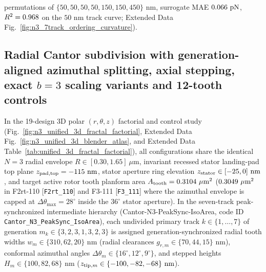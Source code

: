 \documentclass[pdflatex,sn-nature]{sn-jnl}
\DeclareRobustCommand{\roundthree}[1]{\fpeval{round(#1,3)}}
\DeclareRobustCommand{\roundfour}[1]{\fpeval{round(#1,4)}}
\begin{document}
permutations of $\{50, 50, 50, 50, 150, 150, 450\}\text{ nm}$, surrogate MAE $\roundthree{\NthreeCurvRadialModelMaePn}\text{ pN}$, $R^2 = \roundthree{\NthreeCurvTrackFivezeronmRtwo}$ on the $50\text{ nm}$ track curve; Extended Data Fig.~\ref{fig:n3_7track_ordering_curvature}).

\subsection*{Radial Cantor subdivision with generation-aligned azimuthal splitting, axial stepping, exact $b=3$ scaling variants and 12-tooth controls}
In the 19-design 3D polar $(r,\theta,z)$ factorial and control study (Fig.~\ref{fig:n3_unified_3d_fractal_factorial}, Extended Data Fig.~\ref{fig:n3_unified_3d_blender_atlas}, and Extended Data Table~\ref{tab:unified_3d_fractal_factorial}), all configurations share the identical $N=3$ radial envelope $R \in [0.30, 1.65]\ \mu\text{m}$, invariant recessed stator landing-pad top plane $z_{\rm pad,top} = -115\text{ nm}$, stator aperture ring elevation $z_{\rm stator} \in [-25, 0]\text{ nm}$, and target active rotor tooth planform area $A_{\rm tooth} = \roundfour{\NthreeUnithreedFzerozerozeroAreaUmtwo}\ \mu\text{m}^2$ ($\roundfour{\NthreeUnithreedFoneoneoneUnifiedAreaUmtwo}\ \mu\text{m}^2$ in F2rt-110 [\texttt{F2rt\_110}] and F3-111 [\texttt{F3\_111}] where the azimuthal envelope is capped at $\Delta\theta_{\max} = 28^\circ$ inside the $36^\circ$ stator aperture). In the seven-track peak-synchronized intermediate hierarchy (Cantor-N3-PeakSync-IsoArea, code ID \texttt{Cantor\_N3\_PeakSync\_IsoArea}), each undivided primary track $k \in \{1,\dots,7\}$ of generation $m_k \in \{3,2,3,1,3,2,3\}$ is assigned generation-synchronized radial tooth widths $w_{m} \in \{310, 62, 20\}\text{ nm}$ (radial clearances $g_{r,m} \in \{70, 44, 15\}\text{ nm}$), conformal azimuthal angles $\Delta\theta_{m} \in \{16^\circ, 12^\circ, 9^\circ\}$, and stepped heights $H_{m} \in \{100, 82, 68\}\text{ nm}$ ($z_{{\rm tip},m} \in \{-100, -82, -68\}\text{ nm}$).
\end{document}
